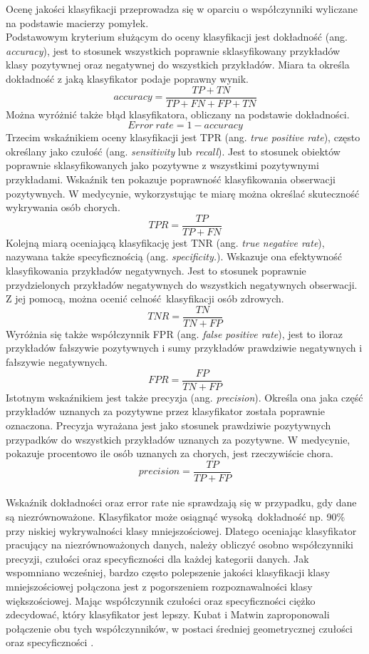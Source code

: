 Ocenę jakości klasyfikacji przeprowadza się w oparciu o współczynniki wyliczane na podstawie macierzy pomyłek.\\
Podstawowym kryterium służącym do oceny klasyfikacji jest dokładność (ang. \textit{accuracy}), jest to stosunek wszystkich poprawnie sklasyfikowany przykładów klasy pozytywnej oraz negatywnej do wszystkich przykładów. Miara ta określa dokładność z jaką klasyfikator podaje poprawny wynik.
\[accuracy = \frac{TP + TN}{TP + FN + FP + TN}\]
Można wyróżnić także błąd klasyfikatora, obliczany na podstawie dokładności.
\[Error\ rate = 1 - accuracy\label{error_rate}\]
Trzecim wskaźnikiem oceny klasyfikacji jest TPR (ang. \textit{true positive rate}), często określany jako czułość (ang. \textit{sensitivity} lub \textit{recall}). Jest to stosunek obiektów poprawnie sklasyfikowanych jako pozytywne z wszystkimi pozytywnymi przykładami. Wskaźnik ten pokazuje poprawność klasyfikowania obserwacji pozytywnych. W medycynie, wykorzystując te miarę można określać skuteczność wykrywania osób chorych.
\[TPR = \frac{TP}{TP + FN}\]
Kolejną miarą oceniającą klasyfikację jest TNR (ang. \textit{true negative rate}), nazywana także specyficznością (ang. \textit{specificity.}). Wskazuje ona efektywność klasyfikowania przykładów negatywnych. Jest to stosunek poprawnie przydzielonych przykładów negatywnych do wszystkich negatywnych obserwacji. Z jej pomocą, można ocenić celność klasyfikacji osób zdrowych.
\[TNR = \frac{TN}{TN + FP}\]
Wyróżnia się także współczynnik FPR (ang. \textit{false positive rate}), jest to iloraz przykładów fałszywie pozytywnych i sumy przykładów prawdziwie negatywnych i fałszywie negatywnych.
\[FPR = \frac{FP}{TN + FP}\]
Istotnym wskaźnikiem jest także precyzja (ang. \textit{precision}). Określa ona jaka część przykładów uznanych za pozytywne przez klasyfikator została poprawnie oznaczona. Precyzja wyrażana jest jako stosunek prawdziwie pozytywnych przypadków do wszystkich przykładów uznanych za pozytywne. W medycynie, pokazuje procentowo ile osób uznanych za chorych, jest rzeczywiście chora.
\[precision = \frac{TP}{TP + FP}\]\\
Wskaźnik dokładności oraz error rate nie sprawdzają się w przypadku, gdy dane są niezrównoważone. Klasyfikator może osiągnąć wysoką dokładność np. 90\% przy niskiej wykrywalności klasy mniejszościowej.
Dlatego oceniając klasyfikator pracujący na niezrównoważonych danych, należy obliczyć osobno współczynniki precyzji, czułości oraz specyficzności dla każdej kategorii danych. Jak wspomniano wcześniej, bardzo często polepszenie jakości klasyfikacji klasy mniejszościowej połączona jest z pogorszeniem rozpoznawalności klasy większościowej. Mając współczynnik czułości oraz specyficzności ciężko zdecydować, który klasyfikator jest lepszy. Kubat i Matwin zaproponowali połączenie obu tych współczynników, w postaci średniej geometrycznej czułości oraz specyficzności \cite{KubatMatwin}. 
